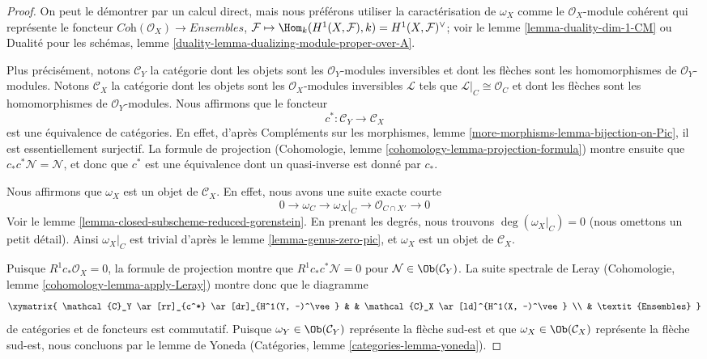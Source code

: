 \begin{proof}
On peut le démontrer par un calcul direct, mais nous préférons utiliser la caractérisation de $\omega_X$ comme le $\mathcal{O}_X$-module cohérent qui représente le foncteur $\textit{Coh}(\mathcal{O}_X) \to \textit{Ensembles}$, $\mathcal{F} \mapsto \Hom_k(H^1(X, \mathcal{F}), k) =
H^1(X, \mathcal{F})^\vee$; voir le lemme \ref{lemma-duality-dim-1-CM} ou Dualité pour les schémas, lemme \ref{duality-lemma-dualizing-module-proper-over-A}.

\medskip\noindent
Plus précisément, notons $\mathcal{C}_Y$ la catégorie dont les objets sont les $\mathcal{O}_Y$-modules inversibles et dont les flèches sont les homomorphismes de $\mathcal{O}_Y$-modules. Notons $\mathcal{C}_X$ la catégorie dont les objets sont les $\mathcal{O}_X$-modules inversibles $\mathcal{L}$ tels que $\mathcal{L}|_C \cong \mathcal{O}_C$ et dont les flèches sont les homomorphismes de $\mathcal{O}_Y$-modules. Nous affirmons que le foncteur $$
c^* : \mathcal{C}_Y \to \mathcal{C}_X
$$ est une équivalence de catégories. En effet, d'après Compléments sur les morphismes, lemme \ref{more-morphisms-lemma-bijection-on-Pic}, il est essentiellement surjectif. La formule de projection (Cohomologie, lemme \ref{cohomology-lemma-projection-formula}) montre ensuite que $c_*c^*\mathcal{N} = \mathcal{N}$, et donc que $c^*$ est une équivalence dont un quasi-inverse est donné par $c_*$.

\medskip\noindent
Nous affirmons que $\omega_X$ est un objet de $\mathcal{C}_X$. En effet, nous avons une suite exacte courte $$
0 \to \omega_C \to \omega_X|_C \to \mathcal{O}_{C \cap X'} \to 0
$$ Voir le lemme \ref{lemma-closed-subscheme-reduced-gorenstein}. En prenant les degrés, nous trouvons $\deg(\omega_X|_C) = 0$ (nous omettons un petit détail). Ainsi $\omega_X|_C$ est trivial d'après le lemme \ref{lemma-genus-zero-pic}, et $\omega_X$ est un objet de $\mathcal{C}_X$.

\medskip\noindent
Puisque $R^1c_*\mathcal{O}_X = 0$, la formule de projection montre que $R^1c_*c^*\mathcal{N} = 0$ pour $\mathcal{N} \in \Ob(\mathcal{C}_Y)$. La suite spectrale de Leray (Cohomologie, lemme \ref{cohomology-lemma-apply-Leray}) montre donc que le diagramme $$
\xymatrix{
\mathcal{C}_Y \ar[rr]_{c^*} \ar[dr]_{H^1(Y, -)^\vee} & &
\mathcal{C}_X \ar[ld]^{H^1(X, -)^\vee} \\
& \textit{Ensembles}
}
$$ de catégories et de foncteurs est commutatif. Puisque $\omega_Y \in \Ob(\mathcal{C}_Y)$ représente la flèche sud-est et que $\omega_X \in \Ob(\mathcal{C}_X)$ représente la flèche sud-est, nous concluons par le lemme de Yoneda (Catégories, lemme \ref{categories-lemma-yoneda}).
\end{proof}

